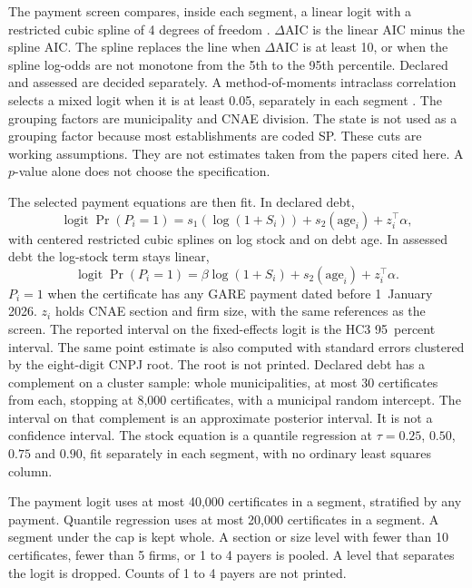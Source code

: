 The payment screen compares, inside each segment, a linear logit with a restricted cubic spline of 4 degrees of freedom \citep{durrleman1989}.
$\Delta$AIC is the linear AIC minus the spline AIC.
The spline replaces the line when $\Delta$AIC is at least 10, or when the spline log-odds are not monotone from the 5th to the 95th percentile.
Declared and assessed are decided separately.
A method-of-moments intraclass correlation selects a mixed logit when it is at least 0.05, separately in each segment \citep{goldstein2002}.
The grouping factors are municipality and CNAE division.
The state is not used as a grouping factor because most establishments are coded SP.
These cuts are working assumptions.
They are not estimates taken from the papers cited here.
A $p$-value alone does not choose the specification.

The selected payment equations are then fit.
In declared debt,
\begin{equation}
\operatorname{logit}\Pr(P_i=1)
  = s_1(\log(1+S_i)) + s_2(\mathrm{age}_i) + z_i^{\top}\alpha,
\label{eq:logit-dec}
\end{equation}
with centered restricted cubic splines on log stock and on debt age.
In assessed debt the log-stock term stays linear,
\begin{equation}
\operatorname{logit}\Pr(P_i=1)
  = \beta\log(1+S_i) + s_2(\mathrm{age}_i) + z_i^{\top}\alpha.
\label{eq:logit-ass}
\end{equation}
$P_i=1$ when the certificate has any GARE payment dated before 1~January 2026.
$z_i$ holds CNAE section and firm size, with the same references as the screen.
The reported interval on the fixed-effects logit is the HC3 95~percent interval.
The same point estimate is also computed with standard errors clustered by the eight-digit CNPJ root.
The root is not printed.
Declared debt has a complement on a cluster sample: whole municipalities, at most 30 certificates from each, stopping at 8,000 certificates, with a municipal random intercept.
The interval on that complement is an approximate posterior interval.
It is not a confidence interval.
The stock equation is a quantile regression at $\tau = 0.25$, $0.50$, $0.75$ and $0.90$, fit separately in each segment, with no ordinary least squares column.

The payment logit uses at most 40,000 certificates in a segment, stratified by any payment.
Quantile regression uses at most 20,000 certificates in a segment.
A segment under the cap is kept whole.
A section or size level with fewer than 10 certificates, fewer than 5 firms, or 1 to 4 payers is pooled.
A level that separates the logit is dropped.
Counts of 1 to 4 payers are not printed.

